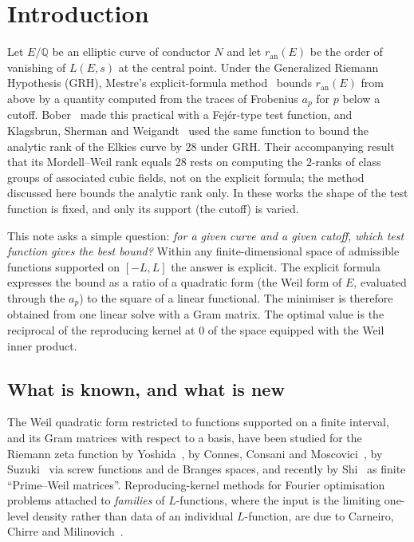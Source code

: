 \documentclass[11pt]{amsart}
\theoremstyle{remark}
\theoremstyle{definition}
\newcommand{\Q}{\mathbb{Q}}
\newcommand{\ran}{r_{\mathrm{an}}}
\begin{document}
\maketitle

\section{Introduction}

Let $E/\Q$ be an elliptic curve of conductor $N$ and let $\ran(E)$ be the order of vanishing of $L(E,s)$ at the central point. Under the Generalized Riemann Hypothesis (GRH), Mestre's explicit-formula method~\cite{Mestre} bounds $\ran(E)$ from above by a quantity computed from the traces of Frobenius $a_p$ for $p$ below a cutoff. Bober~\cite{Bober} made this practical with a Fej\'er-type test function, and Klagsbrun, Sherman and Weigandt~\cite{KSW} used the same function to bound the analytic rank of
the Elkies curve by $28$ under GRH. Their accompanying result that its Mordell--Weil rank equals $28$
rests on computing the $2$-ranks of class groups of associated cubic fields, not on the explicit
formula; the method discussed here bounds the analytic rank only. In these works the shape of the test function is fixed, and only its support (the cutoff) is varied.

This note asks a simple question: \emph{for a given curve and a given cutoff, which test function gives the best bound?} Within any finite-dimensional space of admissible functions supported on $[-L,L]$ the answer is explicit. The explicit formula expresses the bound as a ratio of a quadratic form (the Weil form of $E$, evaluated through the $a_p$) to the square of a linear functional. The minimiser is therefore obtained from one linear solve with a Gram matrix. The optimal value is the reciprocal of the reproducing kernel at $0$ of the space equipped with the Weil inner product.

\subsection*{What is known, and what is new}
The Weil quadratic form restricted to functions supported on a finite interval, and its Gram matrices with respect to a basis, have been studied for the Riemann zeta function by Yoshida~\cite{Yoshida}, by Connes, Consani and Moscovici~\cite{CCM}, by Suzuki~\cite{Suzuki} via screw functions and de Branges spaces, and recently by Shi~\cite{Shi} as finite ``Prime--Weil matrices''. Reproducing-kernel methods for Fourier optimisation problems attached to \emph{families} of $L$-functions, where the input is the limiting one-level density rather than data of an individual $L$-function, are due to Carneiro, Chirre and Milinovich~\cite{CCMil}.
\end{document}

